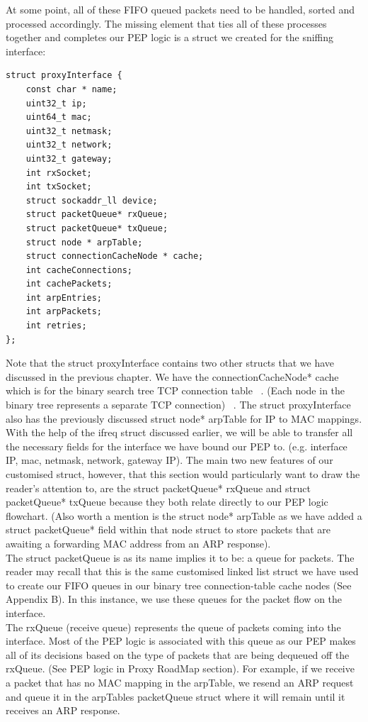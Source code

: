 At some point, all of these FIFO queued packets need to be handled, sorted and processed accordingly. The missing element that ties all of these processes together and completes our PEP logic is a struct we created for the sniffing interface:\\
\begin{lstlisting}
struct proxyInterface {
    const char * name;
    uint32_t ip;
    uint64_t mac;
    uint32_t netmask;
    uint32_t network;
    uint32_t gateway;
    int rxSocket;
    int txSocket;
    struct sockaddr_ll device;
    struct packetQueue* rxQueue;
    struct packetQueue* txQueue;
    struct node * arpTable;
    struct connectionCacheNode * cache;
    int cacheConnections;
    int cachePackets;
    int arpEntries;
    int arpPackets;
    int retries;
};
\end{lstlisting}

Note that the struct proxyInterface contains two other structs that we have discussed in the previous chapter. We have the connectionCacheNode* cache which is for the binary search tree TCP connection table ~\cite{42}. (Each node in the binary tree represents a separate TCP connection) ~\cite{42}. The struct proxyInterface also has the previously discussed struct node* arpTable for IP to MAC mappings.\\

With the help of the ifreq struct discussed earlier, we will be able to transfer all the necessary fields for the interface we have bound our PEP to. (e.g. interface IP, mac, netmask, network, gateway IP). The main two new features of our customised struct, however, that this section would particularly want to draw the reader's attention to, are the struct packetQueue* rxQueue and struct packetQueue* txQueue because they both relate directly to our PEP logic flowchart. (Also worth a mention is the struct node* arpTable as we have added a struct packetQueue* field within that node struct to store packets that are awaiting a forwarding MAC address from an ARP response).\\

The struct packetQueue is as its name implies it to be: a queue for packets. The reader may recall that this is the same customised linked list struct we have used to create our FIFO queues in our binary tree connection-table cache nodes (See Appendix B). In this instance, we use these queues for the packet flow on the interface.\\

The rxQueue (receive queue) represents the queue of packets coming into the interface. Most of the PEP logic is associated with this queue as our PEP makes all of its decisions based on the type of packets that are being dequeued off the rxQueue. (See PEP logic in Proxy RoadMap section). For example, if we receive a packet that has no MAC mapping in the arpTable, we resend an ARP request and queue it in the arpTables packetQueue struct where it will remain until it receives an ARP response.\\


